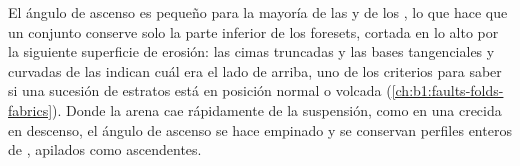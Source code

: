 El ángulo de ascenso es pequeño para la mayoría de las  y de los , lo que hace que un conjunto conserve solo la parte inferior de los foresets, cortada en lo alto
por la siguiente superficie de erosión: las cimas truncadas y las bases tangenciales y curvadas de las  indican cuál era el lado de arriba, uno de los
criterios para saber si una sucesión de estratos está en posición normal o volcada (\cref{ch:b1:faults-folds-fabrics}). Donde la arena cae rápidamente de la suspensión, como en una
crecida en descenso, el ángulo de ascenso se hace empinado y se conservan perfiles enteros de , apilados como  ascendentes.


